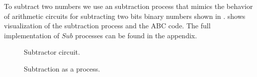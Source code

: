 To subtract two numbers we use an subtraction process that mimics the behavior of arithmetic circuits for subtracting two bits binary numbers shown in 
.
 shows visualization of the subtraction process and the ABC code.
The full implementation of $Sub$ processes can be found in the appendix.
\begin{figure}[H]%
\centering
{}
\caption{Subtractor circuit.}
\label{tra_subtract_circuit}%
\end{figure}
\begin{figure}[H]%
\centering
{}%
\hspace{1em}%
%
\vspace{2em}
%
\caption{Subtraction as a process.}
\label{tra_subttraction}%
\end{figure}
